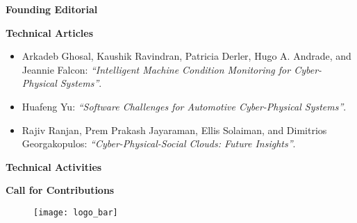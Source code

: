 {
\setlength{\parskip}{.2in}

\textbf{Founding Editorial}

\textbf{Technical Articles}
\vspace{-.2in}
\begin{itemize}
    \item Arkadeb Ghosal, Kaushik Ravindran, Patricia Derler, Hugo A. Andrade, and Jeannie Falcon:
    \textit{``Intelligent Machine Condition Monitoring for Cyber-Physical Systems''}.
    \item Huafeng Yu:
    \textit{``Software Challenges for Automotive Cyber-Physical Systems''}.
    \item Rajiv Ranjan, Prem Prakash Jayaraman, Ellis Solaiman, and Dimitrios Georgakopulos:
    \textit{``Cyber-Physical-Social Clouds: Future Insights''}.
\end{itemize}

\textbf{Technical Activities}

\textbf{Call for Contributions}

}


\begin{figure}[b!]
  \centering
  \texttt{[image: logo\_bar]}
  \caption*{}
\end{figure}


